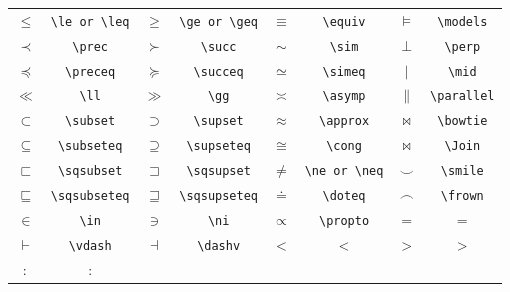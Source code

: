 \begin{table}[H]
\centering
\begin{tabular}{*{8}{c}}
$\leq$ & \verb|\le or \leq| &$\geq$ & \verb|\ge or \geq| &$\equiv$ & \verb|\equiv| &$\models$ & \verb|\models| \\
$\prec$ & \verb|\prec| &$\succ$ & \verb|\succ| &$\sim$ & \verb|\sim| &$\perp$ & \verb|\perp| \\
$\preceq$ & \verb|\preceq| &$\succeq$ & \verb|\succeq| &$\simeq$ & \verb|\simeq| &$\mid$ & \verb|\mid| \\
$\ll$ & \verb|\ll| &$\gg$ & \verb|\gg| &$\asymp$ & \verb|\asymp| &$\parallel$ & \verb|\parallel| \\
$\subset$ & \verb|\subset| &$\supset$ & \verb|\supset| &$\approx$ & \verb|\approx| &$\bowtie$ & \verb|\bowtie| \\
$\subseteq$ & \verb|\subseteq| &$\supseteq$ & \verb|\supseteq| &$\cong$ & \verb|\cong| &$\Join$ & \verb|\Join| \\
$\sqsubset$ & \verb|\sqsubset| &$\sqsupset$ & \verb|\sqsupset| &$\neq$ & \verb|\ne or \neq| &$\smile$ & \verb|\smile| \\
$\sqsubseteq$ & \verb|\sqsubseteq| &$\sqsupseteq$ & \verb|\sqsupseteq| &$\doteq$ & \verb|\doteq| &$\frown$ & \verb|\frown| \\
$\in$&\verb|\in|&$\ni$&\verb|\ni|&$\propto$&\verb|\propto|&$=$&=\\
$\vdash$&\verb|\vdash|&$\dashv$&\verb|\dashv|&$<$&<&$>$&>\\
$:$&:
\end{tabular}
\end{table}



